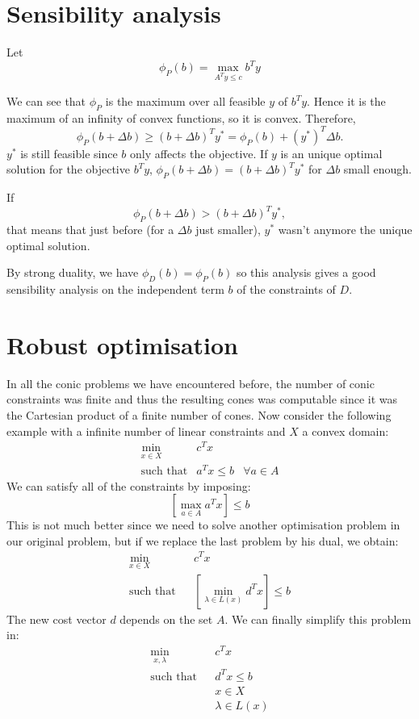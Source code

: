 \section{Sensibility analysis}
Let
\[
  \phi_P(b) = \max_{A^Ty \leq c} b^Ty
\]

We can see that $\phi_P$ is the maximum over all feasible $y$ of $b^Ty$.
Hence it is the maximum of an infinity of convex functions, so it is convex.
Therefore,
\[ \phi_P(b + \Delta b) \geq (b + \Delta b)^T y^* = \phi_P(b) + (y^*)^T \Delta b. \]
$y^*$ is still feasible since $b$ only affects the objective.
If $y$ is an unique optimal solution for the objective $b^Ty$,
$\phi_P(b + \Delta b) = (b + \Delta b)^T y^*$ for $\Delta b$ small enough.

If
\[ \phi_P(b + \Delta b) > (b + \Delta b)^T y^*, \]
that means that just before (for a $\Delta b$ just smaller),
$y^*$ wasn't anymore the unique optimal solution.

By strong duality,
we have $\phi_D(b) = \phi_P(b)$ so this analysis gives a good sensibility analysis on the independent term $b$ of the constraints of $D$.

\section{Robust optimisation}

In all the conic problems we have encountered before, the number of conic constraints was finite and thus the resulting cones was computable since it was the Cartesian product of a finite number of cones. Now consider the following example with a infinite number of linear constraints and $X$ a convex domain:
\begin{eqnarray*}
\min_{x\in X} & c^Tx\\
\text{such that}  & a^Tx \leq b & \forall a\in A
\end{eqnarray*}
We can satisfy all of the constraints by imposing:
$$ \left[\max_{a \in A} a^Tx \right] \leq b $$
This is not much better since we need to solve another optimisation problem in our original problem, but if we replace the last problem by his dual, we obtain:
\begin{eqnarray*}
\min_{x\in X} & & c^Tx\\
\text{such that} & & \left[\min_{\lambda \in L(x)} d^Tx \right] \leq b 
\end{eqnarray*}
The new cost vector $d$ depends on the set $A$. We can finally simplify this problem in:
\begin{eqnarray*}
\min_{x,\lambda} & & c^Tx \\
\text{such that}  & & d^Tx \leq b \\
& & x\in X \\
& & \lambda\in L(x)
\end{eqnarray*}

